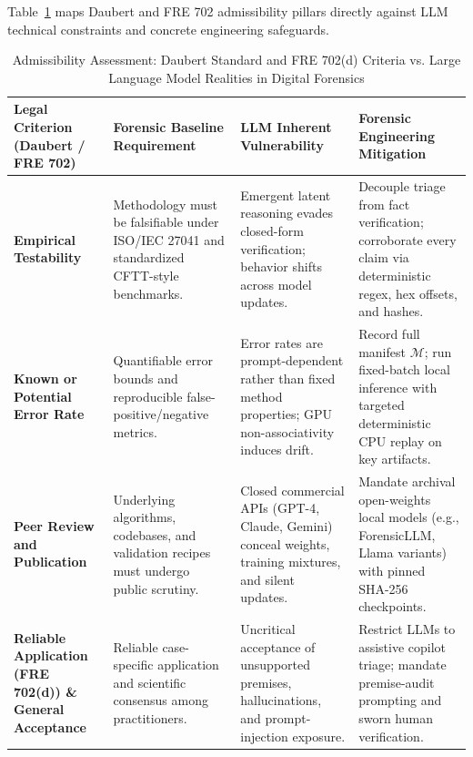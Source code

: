 Table~\ref{tab:daubert_mapping} maps Daubert and FRE 702 admissibility pillars directly against LLM technical constraints and concrete engineering safeguards.

\begin{table}[!t]
\caption{Admissibility Assessment: Daubert Standard and FRE 702(d) Criteria vs. Large Language Model Realities in Digital Forensics}
\label{tab:daubert_mapping}
\centering
\scriptsize
\begin{tabular}{p{2.6cm}p{4.2cm}p{4.4cm}p{4.4cm}}
\toprule
\textbf{Legal Criterion (Daubert / FRE 702)} & \textbf{Forensic Baseline Requirement} & \textbf{LLM Inherent Vulnerability} & \textbf{Forensic Engineering Mitigation} \\
\midrule
\textbf{Empirical Testability} & Methodology must be falsifiable under ISO/IEC 27041 and standardized CFTT-style benchmarks. & Emergent latent reasoning evades closed-form verification; behavior shifts across model updates. & Decouple triage from fact verification; corroborate every claim via deterministic regex, hex offsets, and hashes. \\
\addlinespace
\textbf{Known or Potential Error Rate} & Quantifiable error bounds and reproducible false-positive/negative metrics. & Error rates are prompt-dependent rather than fixed method properties; GPU non-associativity induces drift. & Record full manifest $\mathcal{M}$; run fixed-batch local inference with targeted deterministic CPU replay on key artifacts. \\
\addlinespace
\textbf{Peer Review and Publication} & Underlying algorithms, codebases, and validation recipes must undergo public scrutiny. & Closed commercial APIs (GPT-4, Claude, Gemini) conceal weights, training mixtures, and silent updates. & Mandate archival open-weights local models (e.g., ForensicLLM, Llama variants) with pinned SHA-256 checkpoints. \\
\addlinespace
\textbf{Reliable Application (FRE 702(d)) \& General Acceptance} & Reliable case-specific application and scientific consensus among practitioners. & Uncritical acceptance of unsupported premises, hallucinations, and prompt-injection exposure. & Restrict LLMs to assistive copilot triage; mandate premise-audit prompting and sworn human verification. \\
\bottomrule
\end{tabular}
\end{table}

